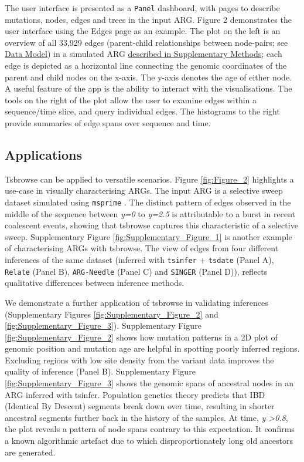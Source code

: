 \documentclass[unnumsec,webpdf,contemporary,large,namedate]{oup-authoring-template}%
\begin{document}
The user interface is presented as a \texttt{Panel} dashboard, with pages to
describe mutations, nodes, edges and trees in the input ARG. Figure 2
demonstrates the user interface using the Edges page as an example. The plot on
the left is an overview of all 33,929 edges (parent-child relationships between
node-pairs; see \hyperref[subsec:Data_Model]{Data Model}) in a simulated ARG
\hyperref[subsec:sweep_simulation]{described in Supplementary Methods}; each
edge is depicted as a horizontal line connecting the genomic coordinates of the
parent and child nodes on the x-axis. The y-axis denotes the age of either
node. A useful feature of the app is the ability to interact with the
visualisations. The tools on the right of the plot allow the user to examine
edges within a sequence/time slice, and query individual edges. The histograms
to the right provide summaries of edge spans over sequence and time.


\subsection{Applications}

 Tsbrowse can be applied to versatile scenarios. Figure \ref{fig:Figure_2}
highlights a use-case in visually characterising ARGs. The input ARG is a
selective sweep dataset simulated using \texttt{msprime}
\citep{baumdicker2022efficient}. The distinct pattern of edges observed in the middle of
the sequence between \textit{y=0} to \textit{y=2.5} is attributable to a burst
in recent coalescent events, showing that tsbrowse captures this characteristic
of a selective sweep. Supplementary Figure \ref{fig:Supplementary_Figure_1} is
another example of characterising ARGs with tsbrowse. The view of edges from
four different inferences of the same dataset (inferred with \texttt{tsinfer} +
\texttt{tsdate} (Panel A), \texttt{Relate} (Panel B), \texttt{ARG-Needle}
(Panel C) and \texttt{SINGER} (Panel D)), reflects qualitative differences
between inference methods. 

We demonstrate a further application of tsbrowse in validating inferences
(Supplementary Figures \ref{fig:Supplementary_Figure_2} and
\ref{fig:Supplementary_Figure_3}). Supplementary Figure
\ref{fig:Supplementary_Figure_2} shows how mutation patterns in a 2D plot of
genomic position and mutation age are helpful in spotting poorly inferred
regions. Excluding regions with low site density from the variant data improves
the quality of inference (Panel B). Supplementary Figure
\ref{fig:Supplementary_Figure_3} shows the genomic spans of ancestral nodes in
an ARG inferred with tsinfer. Population genetics theory predicts that IBD
(Identical By Descent) segments break down over time, resulting in shorter
ancestral segments further back in the history of the samples. At time,
\textit{y \textgreater{0.8}}, the plot reveals a pattern of node spans contrary
to this expectation. It confirms a known algorithmic artefact due to which
disproportionately long old ancestors are generated.
\end{document}
